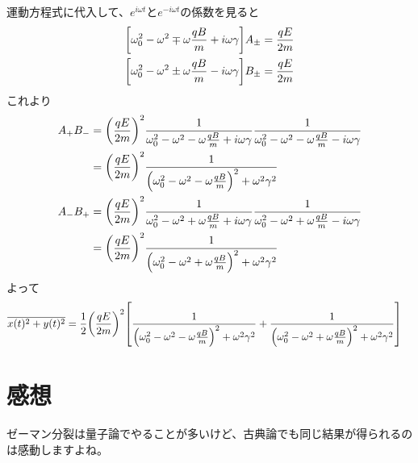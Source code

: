 \documentclass[../ap_2011.tex]{subfiles}
\begin{document}
運動方程式に代入して、\(e^{i\omega t}\)と\(e^{-i\omega t}\)の係数を見ると
\begin{equation}\begin{aligned}[b]
    \qty[\omega_0^2-\omega^2\mp\omega\frac{qB}{m}+i\omega \gamma]A_\pm &= \frac{qE}{2m}\\
    \qty[\omega_0^2-\omega^2\pm\omega\frac{qB}{m}-i\omega \gamma]B_\pm &= \frac{qE}{2m}
\end{aligned}\end{equation}
これより
\begin{equation}\begin{aligned}[b]
    A_+B_-
    &= \qty(\frac{qE}{2m})^2\frac{1}{\omega_0^2-\omega^2-\omega\frac{qB}{m}+i\omega\gamma}\frac{1}{\omega_0^2-\omega^2-\omega\frac{qB}{m}-i\omega\gamma}\\
    &= \qty(\frac{qE}{2m})^2\frac{1}{\qty(\omega_0^2-\omega^2-\omega\frac{qB}{m})^2+\omega^2\gamma^2}\\
    A_-B_+
    &= \qty(\frac{qE}{2m})^2\frac{1}{\omega_0^2-\omega^2+\omega\frac{qB}{m}+i\omega\gamma}\frac{1}{\omega_0^2-\omega^2+\omega\frac{qB}{m}-i\omega\gamma}\\
    &= \qty(\frac{qE}{2m})^2\frac{1}{\qty(\omega_0^2-\omega^2+\omega\frac{qB}{m})^2+\omega^2\gamma^2}
\end{aligned}\end{equation}
よって
\begin{equation}\begin{aligned}[b]
    \overline{x(t)^2+y(t)^2}
    &=\frac{1}{2}\qty(\frac{qE}{2m})^2\qty[\frac{1}{\qty(\omega_0^2-\omega^2-\omega\frac{qB}{m})^2+\omega^2\gamma^2}
    +\frac{1}{\qty(\omega_0^2-\omega^2+\omega\frac{qB}{m})^2+\omega^2\gamma^2}]
\end{aligned}\end{equation}



\section*{感想}
ゼーマン分裂は量子論でやることが多いけど、古典論でも同じ結果が得られるのは感動しますよね。
\end{document}
